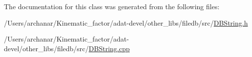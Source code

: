 The documentation for this class was generated from the following files\+:\begin{DoxyCompactItemize}
\item 
/\+Users/archanar/\+Kinematic\+\_\+factor/adat-\/devel/other\+\_\+libs/filedb/src/\mbox{\hyperlink{adat-devel_2other__libs_2filedb_2src_2DBString_8h}{D\+B\+String.\+h}}\item 
/\+Users/archanar/\+Kinematic\+\_\+factor/adat-\/devel/other\+\_\+libs/filedb/src/\mbox{\hyperlink{adat-devel_2other__libs_2filedb_2src_2DBString_8cpp}{D\+B\+String.\+cpp}}\end{DoxyCompactItemize}
